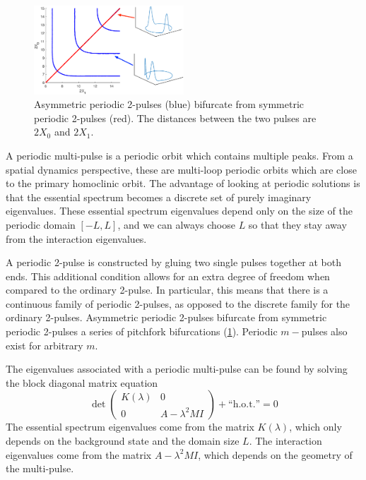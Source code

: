 \documentclass[12pt,reqno,oneside]{amsart}
\theoremstyle{definition}
\theoremstyle{remark}
\begin{document}
\begin{figure}
\includegraphics[width=0.5\textwidth]{images/periodicpitchforklabeled.eps}
\caption{Asymmetric periodic 2-pulses (blue) bifurcate from symmetric periodic 2-pulses (red). The distances between the two pulses are $2X_0$ and $2X_1$.
}
\label{fig:perpitchfork}
\end{figure}
A periodic multi-pulse is a periodic orbit which contains multiple peaks.  From a spatial dynamics perspective, these are multi-loop periodic orbits which are close to the primary homoclinic orbit. The advantage of looking at periodic solutions is that the essential spectrum becomes a discrete set of purely imaginary eigenvalues. These essential spectrum eigenvalues depend only on the size of the periodic domain $[-L, L]$, and we can always choose $L$ so that they stay away from the interaction eigenvalues. 

A periodic 2-pulse is constructed by gluing two single pulses together at both ends. This additional condition allows for an extra degree of freedom when compared to the ordinary 2-pulse. In particular, this means that there is a continuous family of periodic 2-pulses, as opposed to the discrete family for the ordinary 2-pulses. Asymmetric periodic 2-pulses bifurcate from symmetric periodic 2-pulses a series of pitchfork bifurcations (\cref{fig:perpitchfork}). Periodic $m-$pulses also exist for arbitrary $m$.

The eigenvalues associated with a periodic multi-pulse can be found by solving the block diagonal matrix equation
\begin{equation}\label{blockmatrix}
\det\begin{pmatrix}K(\lambda) & 0 \\ 0 & A - \lambda^2 M I \end{pmatrix} + \text{``h.o.t.''} = 0
\end{equation}
The essential spectrum eigenvalues come from the matrix $K(\lambda)$, which only depends on the background state and the domain size $L$. The interaction eigenvalues come from the matrix $A - \lambda^2 M I$, which depends on the geometry of the multi-pulse. 
\end{document}
